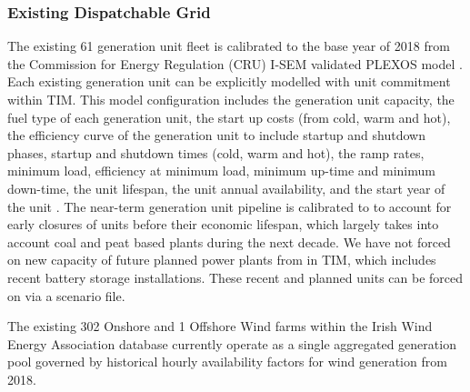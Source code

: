 \documentclass[gmd,manuscript]{copernicus}
\begin{document}
\subsubsection{Existing Dispatchable Grid}
The existing 61 generation unit fleet is calibrated to the base year of 2018 from the Commission for Energy Regulation (CRU) I-SEM validated PLEXOS model \citep{Geffert2018}. Each existing generation unit can be explicitly modelled with unit commitment within TIM. This model configuration includes the generation unit capacity, the fuel type of each generation unit, the start up costs (from cold, warm and hot), the efficiency curve of the generation unit to include startup and shutdown phases, startup and shutdown times (cold, warm and hot), the ramp rates, minimum load, efficiency at minimum load, minimum up-time and minimum down-time, the unit lifespan, the unit annual availability, and the start year of the unit \citep{Geffert2018}. The near-term generation unit pipeline is calibrated to \citet{EirGridadSONI2019,EirGrid&SONI2020} to account for early closures of units before their economic lifespan, which largely takes into account coal and peat based plants during the next decade. We have not forced on new capacity of future planned power plants from \citet{EirGrid&SONI2020} in TIM, which includes recent battery storage installations. These recent and planned units can be forced on via a scenario file. 

The existing 302 Onshore and 1 Offshore Wind farms within the Irish Wind Energy Association database currently operate as a single aggregated generation pool governed by historical hourly availability factors for wind generation from 2018.
\end{document}
